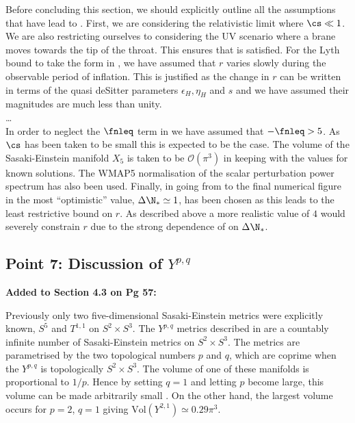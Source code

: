 Before concluding this section, we should explicitly outline all the assumptions that have lead to
. First, we are considering the relativistic limit where $\cs\ll1$. We are
also restricting ourselves to considering the UV scenario where a brane moves towards the tip of
the throat. This ensures that  is satisfied. For the Lyth bound to take the
form in , we have assumed that $r$ varies slowly during the observable
period of inflation. This is justified as the change in $r$ can be written in terms of the
quasi deSitter parameters $\epsilon_H, \eta_H$ and $s$ and we have assumed their magnitudes are
much less than unity.
\\
\ldots
\\
In order to neglect the $\fnleq$ term in  we have assumed that $-\fnleq>5$. As
$\cs$ has been taken to be small this is expected to be the case. The volume of the Sasaki-Einstein
manifold $X_5$ is taken to be $\mathcal{O}(\pi^3)$ in keeping with the values for known solutions.
The WMAP5 normalisation of the scalar perturbation power spectrum has also been used. Finally, in
going from  to the final numerical figure in  the most
``optimistic'' value, $\Delta \N_*\simeq 1$, has been chosen as this leads to the least
restrictive bound on $r$.  As described above a more realistic value of $4$ would severely
constrain $r$ due to the strong dependence of  on $\Delta\N_*$.

\subsection{Point 7: Discussion of \texorpdfstring{$Y^{p,q}$}{Y**p,q}}
\textbf{Added to Section 4.3 on Pg 57:}

Previously only two five-dimensional Sasaki-Einstein
metrics were explicitly known, $S^5$ and $T^{1,1}$ on $S^2\times S^3$. The $Y^{p,q}$ metrics
described in  are a countably infinite number of Sasaki-Einstein metrics on
$S^2\times S^3$. The metrics are parametrised by the two topological numbers $p$ and $q$, which are
coprime when the $Y^{p,q}$ is topologically $S^2\times S^3$. The volume of one of these manifolds
is proportional to $1/p$. Hence by setting $q=1$ and letting $p$ become large, this volume can be
made arbitrarily small \cite{gauntlett}. On the other hand, the largest volume occurs for $p=2$,
$q=1$ giving $\mathrm{Vol}(Y^{2,1})\simeq 0.29\pi^3$. 

